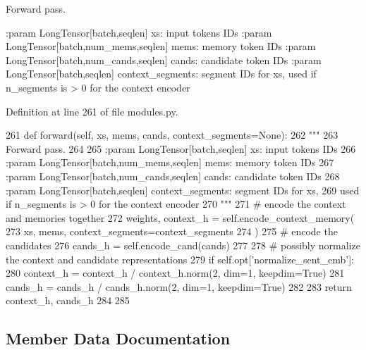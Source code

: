 \begin{DoxyVerb}Forward pass.

:param LongTensor[batch,seqlen] xs: input tokens IDs
:param LongTensor[batch,num_mems,seqlen] mems: memory token IDs
:param LongTensor[batch,num_cands,seqlen] cands: candidate token IDs
:param LongTensor[batch,seqlen] context_segments: segment IDs for xs,
    used if n_segments is > 0 for the context encoder
\end{DoxyVerb}
 

Definition at line 261 of file modules.\+py.


\begin{DoxyCode}
261     \textcolor{keyword}{def }forward(self, xs, mems, cands, context\_segments=None):
262         \textcolor{stringliteral}{"""}
263 \textcolor{stringliteral}{        Forward pass.}
264 \textcolor{stringliteral}{}
265 \textcolor{stringliteral}{        :param LongTensor[batch,seqlen] xs: input tokens IDs}
266 \textcolor{stringliteral}{        :param LongTensor[batch,num\_mems,seqlen] mems: memory token IDs}
267 \textcolor{stringliteral}{        :param LongTensor[batch,num\_cands,seqlen] cands: candidate token IDs}
268 \textcolor{stringliteral}{        :param LongTensor[batch,seqlen] context\_segments: segment IDs for xs,}
269 \textcolor{stringliteral}{            used if n\_segments is > 0 for the context encoder}
270 \textcolor{stringliteral}{        """}
271         \textcolor{comment}{# encode the context and memories together}
272         weights, context\_h = self.encode\_context\_memory(
273             xs, mems, context\_segments=context\_segments
274         )
275         \textcolor{comment}{# encode the candidates}
276         cands\_h = self.encode\_cand(cands)
277 
278         \textcolor{comment}{# possibly normalize the context and candidate representations}
279         \textcolor{keywordflow}{if} self.opt[\textcolor{stringliteral}{'normalize\_sent\_emb'}]:
280             context\_h = context\_h / context\_h.norm(2, dim=1, keepdim=\textcolor{keyword}{True})
281             cands\_h = cands\_h / cands\_h.norm(2, dim=1, keepdim=\textcolor{keyword}{True})
282 
283         \textcolor{keywordflow}{return} context\_h, cands\_h
284 
285 
\end{DoxyCode}


\subsection{Member Data Documentation}
\mbox{\label{classparlai_1_1agents_1_1transformer_1_1modules_1_1TransformerMemNetModel_a95c72e762694a7017243bfcf0b37a1e7}} 
